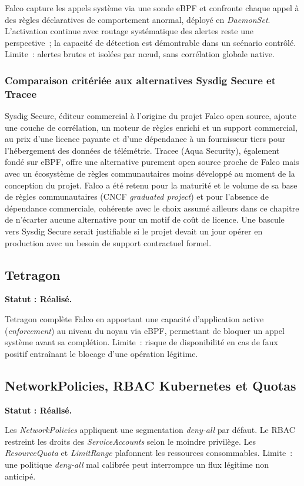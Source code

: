 Falco capture les appels système via une sonde eBPF et confronte chaque appel à des règles déclaratives de comportement anormal, déployé en \textit{DaemonSet}. L'activation continue avec routage systématique des alertes reste une perspective~; la capacité de détection est démontrable dans un scénario contrôlé. Limite~: alertes brutes et isolées par nœud, sans corrélation globale native.

\subsubsection{Comparaison critériée aux alternatives Sysdig Secure et Tracee}
Sysdig Secure, éditeur commercial à l'origine du projet Falco open source, ajoute une couche de corrélation, un moteur de règles enrichi et un support commercial, au prix d'une licence payante et d'une dépendance à un fournisseur tiers pour l'hébergement des données de télémétrie. Tracee (Aqua Security), également fondé sur eBPF, offre une alternative purement open source proche de Falco mais avec un écosystème de règles communautaires moins développé au moment de la conception du projet. Falco a été retenu pour la maturité et le volume de sa base de règles communautaires (CNCF \textit{graduated project}) et pour l'absence de dépendance commerciale, cohérente avec le choix assumé ailleurs dans ce chapitre de n'écarter aucune alternative pour un motif de coût de licence. Une bascule vers Sysdig Secure serait justifiable si le projet devait un jour opérer en production avec un besoin de support contractuel formel.

\subsection{Tetragon}
\textbf{Statut : Réalisé.}

Tetragon complète Falco en apportant une capacité d'application active (\textit{enforcement}) au niveau du noyau via eBPF, permettant de bloquer un appel système avant sa complétion. Limite~: risque de disponibilité en cas de faux positif entraînant le blocage d'une opération légitime.

\subsection{NetworkPolicies, RBAC Kubernetes et Quotas}
\textbf{Statut : Réalisé.}

Les \textit{NetworkPolicies} appliquent une segmentation \textit{deny-all} par défaut. Le RBAC restreint les droits des \textit{ServiceAccounts} selon le moindre privilège. Les \textit{ResourceQuota} et \textit{LimitRange} plafonnent les ressources consommables. Limite~: une politique \textit{deny-all} mal calibrée peut interrompre un flux légitime non anticipé.

